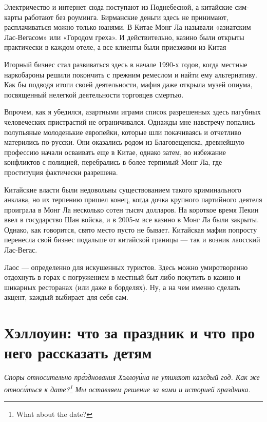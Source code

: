 \begin{fancyquotes}
    Электричество и интернет сюда поступают из Поднебесной, а китайские сим-карты работают без роуминга. Бирманские деньги здесь не принимают, расплачиваться можно только юанями. В Китае Монг Ла называли «азиатским Лас-Вегасом» или «Городом греха». И действительно, казино были открыты практически в каждом отеле, а все клиенты были приезжими из Китая
\end{fancyquotes}

Игорный бизнес стал развиваться здесь в начале 1990-х годов, когда местные наркобароны решили покончить с прежним ремеслом и найти ему альтернативу. Как бы подводя итоги своей деятельности, мафия даже открыла музей опиума, посвященный нелегкой деятельности торговцев смертью.

Впрочем, как я убедился, азартными играми список разрешенных здесь пагубных человеческих пристрастий не ограничивался. Однажды мне навстречу попались полупьяные молоденькие европейки, которые шли покачиваясь и отчетливо матерились по-русски. Они оказались родом из Благовещенска, древнейшую профессию начали осваивать еще в Китае, однако затем, во избежание конфликтов с полицией, перебрались в более терпимый Монг Ла, где проституция фактически разрешена.

Китайские власти были недовольны существованием такого криминального анклава, но их терпению пришел конец, когда дочка крупного партийного деятеля проиграла в Монг Ла несколько сотен тысяч долларов. На короткое время Пекин ввел в государство Шан войска, и в 2005-м все казино в Монг Ла были закрыты. Однако, как говорится, свято место пусто не бывает. Китайская мафия попросту перенесла свой бизнес подальше от китайской границы — так и возник лаосский Лас-Вегас.

Лаос — определенно для искушенных туристов. Здесь можно умиротворенно отдохнуть в горах с погружением в местный быт либо покутить в казино и шикарных ресторанах (или даже в борделях). Ну, а на чем именно сделать акцент, каждый выбирает для себя сам.

\newpage
\section{Хэллоуин: что за праздник и что про него рассказать детям}

\textit{Споры относительно пр\'{а}зднования Хэллоу\'{и}на не утихают каждый год. Как же относ\'{и}ться к дате?\footnote{What about the date?} Мы оставляем решение за вами и  историей праздника.}

